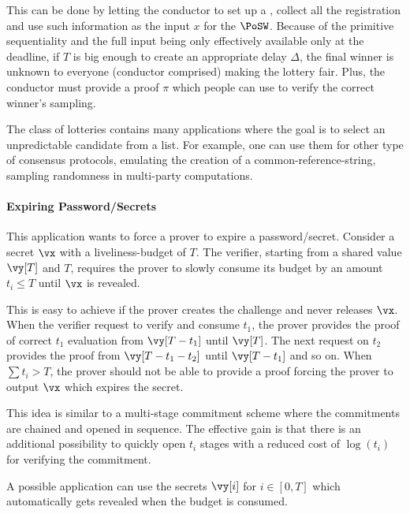 	This can be done by letting the conductor to set up a \PoSW, collect all the registration and use
	such information as the input $x$ for the $\PoSW$.
	Because of the primitive sequentiality and the full input being only effectively available only
	at the deadline,
	if $T$ is big enough to create an appropriate delay $\Delta$, the final winner is unknown to
	everyone (conductor comprised) making the lottery fair.
	Plus, the conductor must provide a proof $\pi$ which people can use to verify the correct winner's
	sampling.

	The class of lotteries contains many applications where the goal is to select an unpredictable
	candidate from a list.
	For example, one can use them for other type of consensus protocols, emulating the creation
	of a common-reference-string, sampling randomness in multi-party computations.
	


\paragraph{Expiring Password/Secrets}
	
	This application wants to force a prover to expire a password/secret.
	Consider a secret $\vx$ with a liveliness-budget of $T$.
	The verifier, starting from a shared value $\vy[T]$ and $T$, requires the prover to slowly
	consume its budget by an amount $t_i \leq T$ until $\vx$ is revealed.
	
	This is easy to achieve if the prover creates the challenge and never releases $\vx$.
	When the verifier request to verify and consume $t_1$, the prover provides the proof
	of correct $t_1$ evaluation from $\vy[T-t_1]$ until $\vy[T]$.
	The next request on $t_2$ provides the proof from $\vy[T-t_1-t_2]$ until $\vy[T-t_1]$ and so on.
	When $\sum t_i > T$, the prover should not be able to provide a proof forcing the prover to
	output $\vx$ which expires the secret.
	
	This idea is similar to a multi-stage commitment scheme where the commitments are chained and
	opened in sequence.
	The effective gain is that there is an additional possibility to quickly open $t_i$ stages
	with a reduced cost of $\log(t_i)$ for verifying the commitment.
	
	A possible application can use the secrets $\vy[i]$ for $i\in[0,T]$ which automatically gets
	revealed when the budget is consumed.
